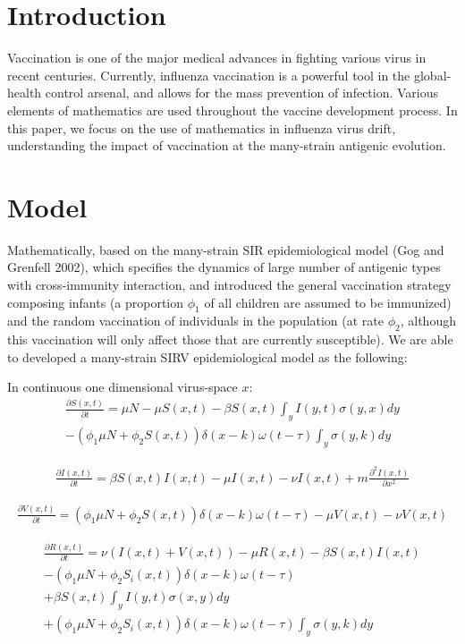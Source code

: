\documentclass[preprint,12pt]{elsarticle}
\begin{document}
\section{Introduction}
Vaccination is one of the major medical advances in fighting various virus in recent centuries. 
Currently, influenza vaccination is a powerful tool in the global-health control arsenal, and allows for the mass prevention of infection.
Various elements of mathematics are used throughout the vaccine development process.
In this paper, we focus on the use of mathematics in influenza virus drift, understanding the impact of vaccination at the many-strain antigenic evolution. 

\section{Model}
Mathematically, based on the many-strain SIR epidemiological model (Gog and Grenfell 2002), which specifies the dynamics of large number of antigenic types with cross-immunity interaction, and introduced the general vaccination strategy composing infants (a proportion \(\phi_{1}\) of all children are assumed to be immunized) and the random vaccination of individuals in the population (at rate \(\phi_{2}\), although this vaccination will only affect those that are currently susceptible).
We are able to developed a many-strain SIRV epidemiological model as the following:

\newpage
In continuous one dimensional virus-space \(x\):
\begin{align}
  \label{eq:S}
  \frac{\partial S(x,t)}{\partial t} = \mu N - \mu S(x,t) - \beta S(x,t) \int_{y} I(y,t)\sigma(y,x) dy
 \nonumber\\
  -(\phi_{1}\mu N + \phi_{2} S(x,t)) \delta(x-k)\omega(t-\tau) \int_{y} \sigma(y,k) dy
\end{align}

\begin{align}
  \label{eq:I}
  \frac{\partial I(x,t)}{\partial t} = \beta S(x,t) I(x,t) - \mu I(x,t) - \nu I(x,t) + m \frac{\partial^2I(x,t)}{\partial x^2}
\end{align}

\begin{align}
  \label{eq:V}
  \frac{\partial V(x,t)}{\partial t} = (\phi_{1}\mu N + \phi_{2} S(x,t)) \delta(x-k)\omega(t-\tau)  - \mu V(x,t) - \nu V(x,t)
\end{align}

\begin{align}
  \label{eq:R}
  \frac{\partial R(x,t)}{\partial t} = \nu (I(x,t) + V(x,t)) - \mu R(x,t) - \beta S(x,t) I(x,t) 
   \nonumber\\
   -(\phi_{1}\mu N + \phi_{2} S_i(x,t)) \delta(x-k)\omega(t-\tau)
  \nonumber\\
  +\beta S(x,t)\int_{y} I(y,t)\sigma(x,y) dy
  \nonumber\\
  +(\phi_{1}\mu N + \phi_{2} S_i(x,t)) \delta(x-k)\omega(t-\tau) \int_{y} \sigma(y,k) dy
\end{align}
\end{document}

